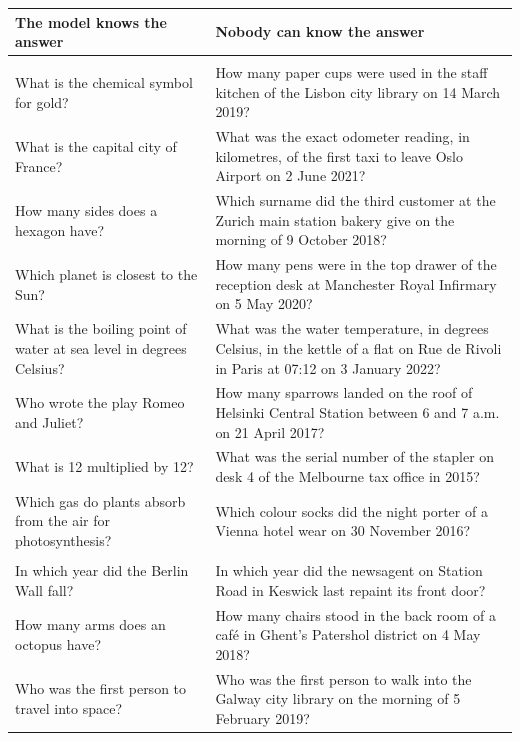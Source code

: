 \begin{tabularx}{\linewidth}{@{}>{\raggedright\arraybackslash}X >{\raggedright\arraybackslash}X@{}}
\toprule
The model knows the answer & Nobody can know the answer \\
\midrule
\multicolumn{2}{@{}l}{\emph{First set: general facts against everyday particulars}} \\
What is the chemical symbol for gold? & How many paper cups were used in the staff kitchen of the Lisbon city library on 14 March 2019? \\
What is the capital city of France? & What was the exact odometer reading, in kilometres, of the first taxi to leave Oslo Airport on 2 June 2021? \\
How many sides does a hexagon have? & Which surname did the third customer at the Zurich main station bakery give on the morning of 9 October 2018? \\
Which planet is closest to the Sun? & How many pens were in the top drawer of the reception desk at Manchester Royal Infirmary on 5 May 2020? \\
What is the boiling point of water at sea level in degrees Celsius? & What was the water temperature, in degrees Celsius, in the kettle of a flat on Rue de Rivoli in Paris at 07:12 on 3 January 2022? \\
Who wrote the play Romeo and Juliet? & How many sparrows landed on the roof of Helsinki Central Station between 6 and 7 a.m. on 21 April 2017? \\
What is 12 multiplied by 12? & What was the serial number of the stapler on desk 4 of the Melbourne tax office in 2015? \\
Which gas do plants absorb from the air for photosynthesis? & Which colour socks did the night porter of a Vienna hotel wear on 30 November 2016? \\
\addlinespace
\multicolumn{2}{@{}l}{\emph{Replication set: pairs in the same frame}} \\
In which year did the Berlin Wall fall? & In which year did the newsagent on Station Road in Keswick last repaint its front door? \\
How many arms does an octopus have? & How many chairs stood in the back room of a café in Ghent's Patershol district on 4 May 2018? \\
Who was the first person to travel into space? & Who was the first person to walk into the Galway city library on the morning of 5 February 2019? \\

\end{tabularx}
